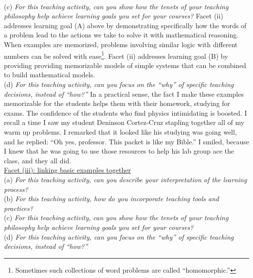 \documentclass[../../../main.tex]{subfiles}
\begin{document}
\\
\vspace{0.25cm}
(c) \textit{For this teaching activity, can you show how the tenets of your teaching philosophy help achieve learning goals you set for your courses?}  Facet (ii) addresses learning goal (A) above by demonstrating specifically how the words of a problem lead to the actions we take to solve it with mathematical reasoning.  When examples are memorized, problems involving similar logic with different numbers can be solved with ease\footnote{Sometimes such collections of word problems are called ``homomorphic.''}.  Facet (ii) addresses learning goal (B) by providing providing memorizable models of simple systems that can be combined to build mathematical models.
\\
\vspace{0.25cm}
(d) \textit{For this teaching activity, can you focus on the ``why'' of specific teaching decisions, instead of ``how?''} In a practical sense, the fact I make these examples memorizable for the students helps them with their homework, studying for exams.  The confidence of the students who find physics intimidating is boosted.  I recall a time I saw my student Deninson Cortez-Cruz stapling together all of my warm up problems.  I remarked that it looked like his studying was going well, and he replied: ``Oh yes, professor.  This packet is like my Bible.''  I smiled, because I knew that he was going to use those resources to help his lab group ace the class, and they all did.
\\
\vspace{0.25cm}
\underline{Facet (iii): linking basic examples together}
\\
\vspace{0.25cm}
(a) \textit{For this teaching activity, can you describe your interpretation of the learning process?} 
\\
\vspace{0.25cm}
(b) \textit{For this teaching activity, how do you incorporate teaching tools and practices?}
\\
\vspace{0.25cm}
(c) \textit{For this teaching activity, can you show how the tenets of your teaching philosophy help achieve learning goals you set for your courses?}
\\
\vspace{0.25cm}
(d) \textit{For this teaching activity, can you focus on the ``why'' of specific teaching decisions, instead of ``how?''}
\\
\vspace{0.25cm}
\end{document}
